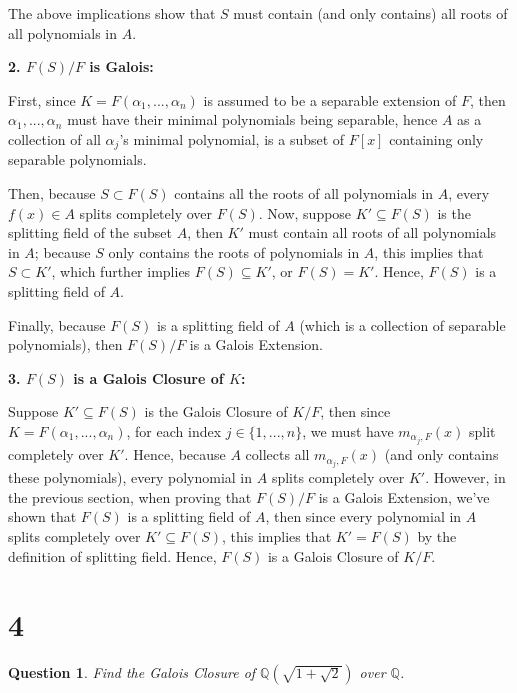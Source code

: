 \documentclass{article}
\newtheorem{question}{Question}
\begin{document}
The above implications show that $S$ must contain (and only contains) all roots of all polynomials in $A$.

\vspace*{0.5em}

\textbf{2. $F(S)/F$ is Galois:}

First, since $K = F(\alpha_1,...,\alpha_n)$ is assumed to be a separable extension of $F$, then $\alpha_1,...,\alpha_n$ must have their minimal polynomials being separable, hence $A$ as a collection of all $\alpha_j$'s minimal polynomial, is a subset of $F[x]$ containing only separable polynomials.

Then, because $S\subset F(S)$ contains all the roots of all polynomials in $A$, every $f(x)\in A$ splits completely over $F(S)$. Now, suppose $K'\subseteq F(S)$ is the splitting field of the subset $A$, then $K'$ must contain all roots of all polynomials in $A$; because $S$ only contains the roots of polynomials in $A$, this implies that $S\subset K'$, which further implies $F(S)\subseteq K'$, or $F(S)=K'$. Hence, $F(S)$ is a splitting field of $A$.

Finally, because $F(S)$ is a splitting field of $A$ (which is a collection of separable polynomials), then $F(S)/F$ is a Galois Extension.

\vspace*{0.5em}

\textbf{3. $F(S)$ is a Galois Closure of $K$:}

Suppose $K'\subseteq F(S)$ is the Galois Closure of $K/F$, then since $K=F(\alpha_1,...,\alpha_n)$, for each index $j\in\{1,...,n\}$, we must have $m_{\alpha_j,F}(x)$ split completely over $K'$. Hence, because $A$ collects all $m_{\alpha_j,F}(x)$ (and only contains these polynomials), every polynomial in $A$ splits completely over $K'$. However, in the previous section, when proving that $F(S)/F$ is a Galois Extension, we've shown that $F(S)$ is a splitting field of $A$, then since every polynomial in $A$ splits completely over $K'\subseteq F(S)$, this implies that $K'=F(S)$ by the definition of splitting field. Hence, $F(S)$ is a Galois Closure of $K/F$.

\break

\section*{4}
\begin{myBox}[]{}
    \begin{question}
        Find the Galois Closure of $\mathbb{Q}(\sqrt{1+\sqrt{2}})$ over $\mathbb{Q}$.
    \end{question}
\end{myBox}
\end{document}
